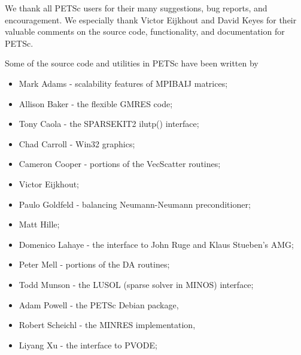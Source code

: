 %
%

\medskip \medskip \noindent
We thank all PETSc users for their many suggestions, bug reports, and
encouragement.  We especially thank Victor Eijkhout and David Keyes
for their valuable comments on the source code,
functionality, and documentation for PETSc.


\vspace{.3in}
\noindent
Some of the source code and utilities in PETSc
have been written by 
\begin{itemize}
  \item Mark Adams - scalability features of MPIBAIJ matrices;
  \item Allison Baker - the flexible GMRES code;
  \item Tony Caola - the SPARSEKIT2 ilutp() interface;
  \item Chad Carroll - Win32 graphics;
  \item Cameron Cooper - portions of the VecScatter routines;
  \item Victor Eijkhout;
  \item Paulo Goldfeld - balancing Neumann-Neumann preconditioner;
  \item Matt Hille;
  \item Domenico Lahaye - the interface to John Ruge and Klaus Stueben's AMG;
  \item Peter Mell - portions of the DA routines;
  \item Todd Munson - the LUSOL (sparse solver in MINOS) interface;
  \item Adam Powell - the PETSc Debian package, 
  \item Robert Scheichl - the MINRES implementation,
  \item Liyang Xu - the interface to PVODE;
\end{itemize}

